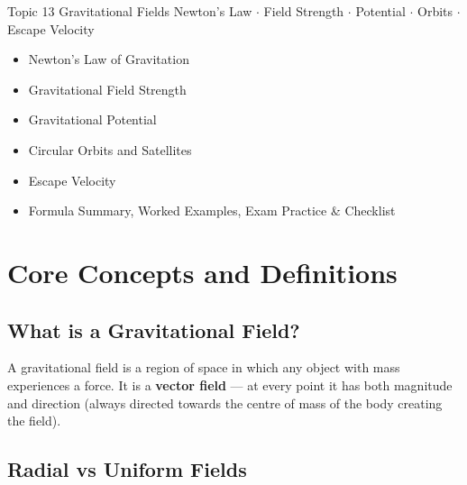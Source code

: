 
\setcounter{section}{0}

\maketitlepage
  {Topic 13}
  {Gravitational Fields}
  {Newton's Law \(\cdot\) Field Strength \(\cdot\) Potential \(\cdot\) Orbits \(\cdot\) Escape Velocity}
  {%
    \begin{itemize}[leftmargin=1cm, itemsep=2pt, label=\textbullet, topsep=4pt]
      \item Newton's Law of Gravitation
      \item Gravitational Field Strength
      \item Gravitational Potential
      \item Circular Orbits and Satellites
      \item Escape Velocity
      \item Formula Summary, Worked Examples, Exam Practice \& Checklist
    \end{itemize}
  }

\tableofcontents
\newpage

\section{Core Concepts and Definitions}

\subsection{What is a Gravitational Field?}

A gravitational field is a region of space in which any object with mass experiences a
force. It is a \textbf{vector field} — at every point it has both magnitude and
direction (always directed towards the centre of mass of the body creating the field).

\subsection{Radial vs Uniform Fields}

